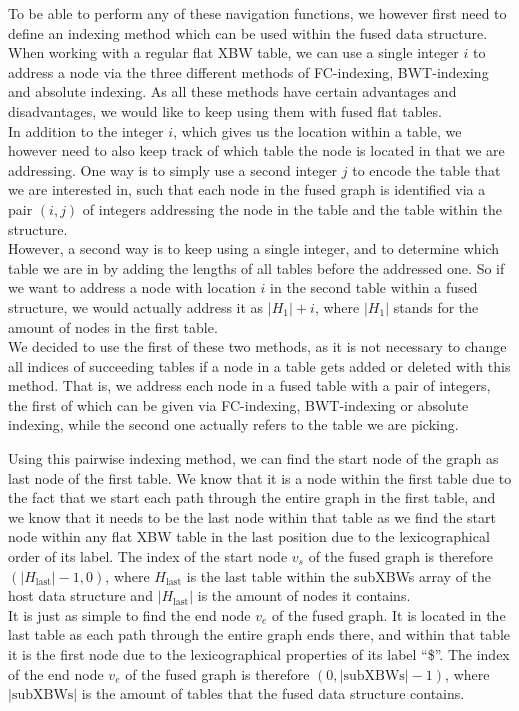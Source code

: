 \documentclass[a4paper,12pt,twoside,BCOR=10mm]{scrbook}
\begin{document}
To be able to perform any of these navigation functions, we however first need to 
define an indexing method which can be used within the fused data structure. 
When working with a regular flat XBW table, we can use a single integer $ i $ to 
address a node via the three different methods of FC-indexing, BWT-indexing and absolute indexing. 
As all these methods have certain advantages and disadvantages, we would like to 
keep using them with fused flat tables. \\
In addition to the integer $ i $, which gives us the location within a table, 
we however need to also keep track of which table the node is located in that we are addressing. 
One way is to simply use a second integer $ j $ to encode the table that we are interested in, 
such that each node in the fused graph is identified via a pair $ (i, j) $ of integers addressing the 
node in the table and the table within the structure. \\
However, a second way is to keep using a single integer, and to determine which table we are in 
by adding the lengths of all tables before the addressed one. So if we want to address a node 
with location $ i $ in the second table within a fused structure, we would actually address it as $ | H_1 | + i $, 
where $ | H_1 | $ stands for the amount of nodes in the first table. \\
We decided to use the first of these two methods, as it is not necessary to change all indices 
of succeeding tables if a node in a table gets added or deleted with this method. 
That is, we address each node in a fused table with a pair of integers, the first of which 
can be given via FC-indexing, BWT-indexing or absolute indexing, while the second one 
actually refers to the table we are picking.

Using this pairwise indexing method, we can find the start node of the graph as 
last node of the first table. 
We know that it is a node within the first table due to the fact that we start each path 
through the entire graph 
in the first table, and we know that it needs to be the last node within that table 
as we find the start node within any flat XBW table in the last position due to 
the lexicographical order of its label. 
The index of the start node $ v_s $ of the fused graph 
is therefore $ ( | H_{\textrm{last}} | - 1, 0 ) $, 
where $ H_{\textrm{last}} $ is the last table within the subXBWs array of the host data structure and 
$ | H_{\textrm{last}} | $ is the amount of nodes it contains. \\
It is just as simple to find the end node $ v_e $ of the fused graph. 
It is located in the last table as each path through the entire graph ends there, 
and within that table it is the first node due to the lexicographical properties of 
its label “\$”. 
The index of the end node $ v_e $ of the fused graph 
is therefore $ ( 0, | \textrm{subXBWs} | - 1 ) $, 
where $ | \textrm{subXBWs} | $ is the amount of tables 
that the fused data structure contains.
\end{document}
